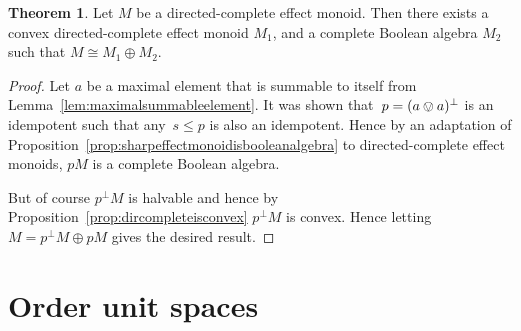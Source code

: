 \documentclass[10pt,conference]{IEEEtran}
\DeclarePairedDelimiter{\ceil}{\lceil}{\rceil}
\newcounter{counter}
\theoremstyle{definition}
\newtheorem{theorem}[counter]{Theorem}
\newtheorem{proposition}[counter]{Proposition}
\begin{document}
\begin{theorem}\label{thm:directedcompleteisconvex}
    Let $M$ be a directed-complete effect monoid.
    Then there exists a convex directed-complete effect monoid $M_1$,
    and a complete Boolean algebra $M_2$ such that
    $M\cong M_1\oplus M_2$.
\end{theorem}
\begin{proof}
    Let $a$ be a maximal element that is summable to itself from
    Lemma~\ref{lem:maximalsummableelement}. It was shown
    that~$p = (a\ovee a)^\perp$ is an idempotent such
    that any~$s\leq p$ is also an
    idempotent. Hence by an adaptation of Proposition~\ref{prop:sharpeffectmonoidisbooleanalgebra} to directed-complete effect monoids, $pM$ is a complete Boolean algebra.

    But of course $p^\perp M$ is halvable and hence by 
    Proposition~\ref{prop:dircompleteisconvex} $p^\perp M$ is convex.
    Hence letting $M=p^\perp M \oplus pM$ gives the desired result.
\end{proof}






\section{Order unit spaces}\label{sec:OUS}
\end{document}

